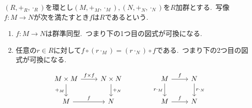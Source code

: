 \begin{definition} \label{def: IsLinearMap}
$(R, +_R, \cdot_R)$を環とし$(M, +_M, \cdot_M), (N, +_N, \cdot_N)$を$R$加群とする.\
写像$f \colon M \to N$が次を満たすとき$f$は$R$であるという.
\def\labelenumi{(\theenumi)\hspace{.5\zw}}
\begin{enumerate}
    \item $f \colon M \to N$は群準同型.\
    つまり下の1つ目の図式が可換になる.
    \item 任意の$r \in R$に対して$f \circ (r \cdot_M) = (r \cdot_N) \circ f$である.\
    つまり下の2つ目の図式が可換になる.
\end{enumerate}
\[\begin{tikzcd}
	{M \times M} & {N \times N} && M & N \\
	M & N && M & N
	\arrow["{f \times f}", from=1-1, to=1-2]
	\arrow["{+_M}"', from=1-1, to=2-1]
	\arrow["{+_N}", from=1-2, to=2-2]
	\arrow["f", from=1-4, to=1-5]
	\arrow["{r\cdot_M}"', from=1-4, to=2-4]
	\arrow["{r\cdot_N}", from=1-5, to=2-5]
	\arrow["f", from=2-1, to=2-2]
	\arrow["f", from=2-4, to=2-5]
\end{tikzcd}\]
\end{definition}

